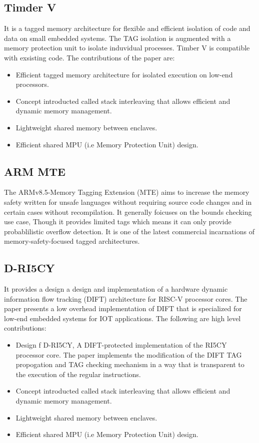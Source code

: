 \subsection{Timder V}
 It is a tagged memory architecture for flexible and efficient isolation of code and data on 
 small embedded systems. The TAG isolation is augmented with a memory protection unit to isolate 
 induvidual processes. Timber V is compatible with exsisting code. The contributions of the paper 
 are: 
 \begin{itemize}
  \item Efficient tagged memory architecture for isolated execution on low-end processors. 
  \item Concept introducted called stack interleaving that allows efficient and dynamic memory management. 
  \item Lightweight shared memory between enclaves. 
  \item Efficient shared MPU (i.e Memory Protection Unit) design. 
 \end{itemize}
 

	
\subsection{ARM MTE}
The ARMv8.5-Memory Tagging Extension (MTE) aims to increase the memory safety written for 
unsafe languages without requiring source code changes and in certain cases without 
recompilation. It generally foicuses on the bounds checking use case, Though it 
provides limited tags which means it can only provide probablilistic overflow detection. 
It is one of the latest commercial incarnations of memory-safety-focused tagged architectures.   

\subsection{D-RI5CY}
It provides a design a design and implementation of a hardware dynamic information flow 
tracking (DIFT) architecture for RISC-V processor cores. The paper presents a low 
overhead implementation of DIFT that is specialized for low-end embedded systems
for IOT applications. The following are high level contributions:
\begin{itemize}
  \item Design f D-RI5CY, A DIFT-protected implementation of the RI5CY processor core. 
        The paper implements the modification of the DIFT TAG propogation and TAG checking
        mechanism in a way that is transparent to the execution of the regular instructions. 
  \item Concept introducted called stack interleaving that allows efficient and dynamic memory management.
  \item Lightweight shared memory between enclaves.
  \item Efficient shared MPU (i.e Memory Protection Unit) design.
\end{itemize}


